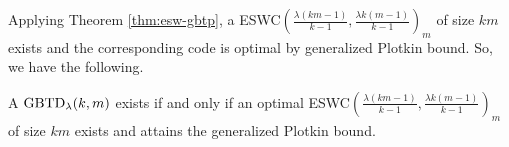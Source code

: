 \documentclass[draft, 11pt]{article}
\begin{document}
Applying Theorem \ref{thm:esw-gbtp}, a ESWC$\left(\frac{\lambda(km-1)}{k-1},\frac{\lambda
 k(m-1)}{k-1}\right)_m$ of size $km$ exists and the corresponding code is optimal
 by generalized Plotkin bound. So, we have the following.
 
 


 \begin{theorem}
 \label{thm:esw-gbtd} A $\textrm{GBTD}_\lambda(k,m)$ exists 
 if and only if an optimal ESWC$\left(\frac{\lambda(km-1)}{k-1},\frac{\lambda
 k(m-1)}{k-1}\right)_m$ of size
 $km$ exists and attains the generalized Plotkin bound.
%
 \end{theorem}
\end{document}
